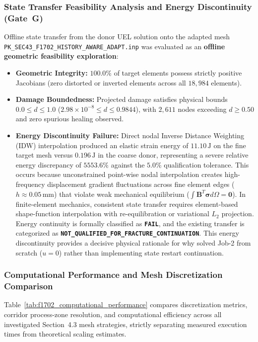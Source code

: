 \subsubsection{State Transfer Feasibility Analysis and Energy Discontinuity (Gate~G)}
Offline state transfer from the donor UEL solution onto the adapted mesh \texttt{PK\_SEC43\_F1702\_HISTORY\_AWARE\_ADAPT.inp} was evaluated as an \textbf{offline geometric feasibility exploration}:
\begin{itemize}
  \item \textbf{Geometric Integrity:} $100.0\%$ of target elements possess strictly positive Jacobians (zero distorted or inverted elements across all $18{,}984$ elements).
  \item \textbf{Damage Boundedness:} Projected damage satisfies physical bounds $0.0 \le d \le 1.0$ ($2.98 \times 10^{-8} \le d \le 0.9844$), with $2{,}611$ nodes exceeding $d \ge 0.50$ and zero spurious healing observed.
  \item \textbf{Energy Discontinuity Failure:} Direct nodal Inverse Distance Weighting (IDW) interpolation produced an elastic strain energy of $11.10\,\mathrm{J}$ on the fine target mesh versus $0.196\,\mathrm{J}$ in the coarse donor, representing a severe relative energy discrepancy of $5553.6\%$ against the $5.0\%$ qualification tolerance. This occurs because unconstrained point-wise nodal interpolation creates high-frequency displacement gradient fluctuations across fine element edges ($h \approx 0.05\,\mathrm{mm}$) that violate weak mechanical equilibrium ($\int \mathbf{B}^T \boldsymbol{\sigma} d\Omega = \mathbf{0}$). In finite-element mechanics, consistent state transfer requires element-based shape-function interpolation with re-equilibration or variational $L_2$ projection. Energy continuity is formally classified as \textbf{\texttt{FAIL}}, and the existing transfer is categorized as \textbf{\texttt{NOT\_QUALIFIED\_FOR\_FRACTURE\_CONTINUATION}}. This energy discontinuity provides a decisive physical rationale for why \citet{pandey2025} solved Job-2 from scratch ($u = 0$) rather than implementing state restart continuation.
\end{itemize}

\subsubsection{Computational Performance and Mesh Discretization Comparison}
Table~\ref{tab:f1702_computational_performance} compares discretization metrics, corridor process-zone resolution, and computational efficiency across all investigated Section~4.3 mesh strategies, strictly separating measured execution times from theoretical scaling estimates.

